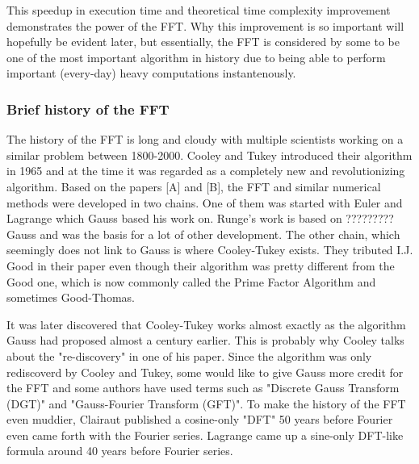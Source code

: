 This speedup in execution time and theoretical time complexity improvement demonstrates the power of the FFT. Why this improvement is so important will hopefully be evident later, but essentially, the FFT is considered by some to be one of the most important algorithm in history due to being able to perform important (every-day) heavy computations instantenously. 

\subsubsection{Brief history of the FFT} 
The history of the FFT is long and cloudy with multiple scientists working on a similar problem between 1800-2000. Cooley and Tukey introduced their algorithm in 1965 and at the time it was regarded as a completely new and revolutionizing algorithm. Based on the papers [A] and [B], the FFT and similar numerical methods were developed in two chains. One of them was started with Euler and Lagrange which Gauss based his work on. Runge's work is based on ????????? Gauss and was the basis for a lot of other development. The other chain, which seemingly does not link to Gauss is where Cooley-Tukey exists. They tributed I.J. Good in their paper even though their algorithm was pretty different from the Good one, which is now commonly called the Prime Factor Algorithm and sometimes Good-Thomas. 


It was later discovered that Cooley-Tukey works almost exactly as the algorithm Gauss had proposed almost a century earlier. This is probably why Cooley talks about the "re-discovery" in one of his paper. Since the algorithm was only rediscoverd by Cooley and Tukey, some would like to give Gauss more credit for the FFT and some authors have used terms such as "Discrete Gauss Transform (DGT)" and "Gauss-Fourier Transform (GFT)". To make the history of the FFT even muddier, Clairaut published a cosine-only "DFT" 50 years before Fourier even came forth with the Fourier series. Lagrange came up a sine-only DFT-like formula around 40 years before Fourier series.


